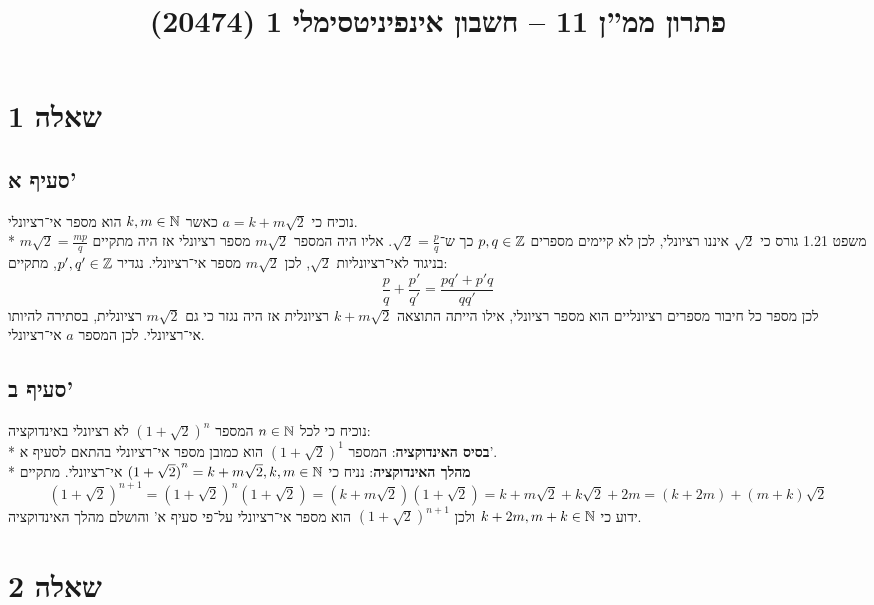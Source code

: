 
\title{פתרון ממ''ן 11 – חשבון אינפיניטסימלי 1 (20474)}


\maketitle
\section{שאלה 1}
\subsection{סעיף א'}
נוכיח כי $a = k + m \sqrt{2}$ כאשר $k, m \in \mathbb{N}$ הוא מספר אי־רציונלי. \\*
משפט 1.21 גורס כי $\sqrt{2}$ איננו רציונלי, לכן לא קיימים מספרים $p, q \in \mathbb{Z}$ כך ש־$\sqrt{2} = \frac{p}{q}$.
אליו היה המספר $m \sqrt{2}$ מספר רציונלי אז היה מתקיים $m \sqrt{2} = \frac{mp}{q}$ בניגוד לאי־רציונליות $\sqrt{2}$,
לכן $m\sqrt{2}$ מספר אי־רציונלי.
נגדיר $p', q' \in \mathbb{Z}$, מתקיים:
\[
	\frac{p}{q} + \frac{p'}{q'} = \frac{p q' + p'q}{q q'}
\]
לכן מספר כל חיבור מספרים רציונליים הוא מספר רציונלי, אילו הייתה התוצאה $k + m\sqrt{2}$ רציונלית אז היה נגזר כי גם $m\sqrt{2}$ רציונלית,
בסתירה להיותו אי־רציונלי. לכן המספר $a$ אי־רציונלי.

\subsection{סעיף ב'}
נוכיח כי לכל $n \in \mathbb{N}$ המספר ${(1 + \sqrt{2})}^n$ לא רציונלי באינדוקציה: \\*
\textbf{בסיס האינדוקציה}:
המספר ${(1 + \sqrt{2})}^1$ הוא כמובן מספר אי־רציונלי בהתאם לסעיף א'. \\*
\textbf{מהלך האינדוקציה}:
נניח כי ${(1 + \sqrt{2})}^n = k + m\sqrt{2}, k, m \in \mathbb{N}$ אי־רציונלי. מתקיים
\[
	{(1 + \sqrt{2})}^{n + 1}
	= {(1 + \sqrt{2})}^n {(1 + \sqrt{2})}
	= (k + m \sqrt{2}) (1 + \sqrt{2})
	= k + m \sqrt{2} + k \sqrt{2} + 2m
	= (k + 2m) + (m + k) \sqrt{2}
\]
ידוע כי $k + 2m, m + k \in \mathbb{N}$ ולכן ${(1 + \sqrt{2})}^{n + 1}$ הוא מספר אי־רציונלי על־פי סעיף א' והושלם מהלך האינדוקציה.

\section{שאלה 2}
